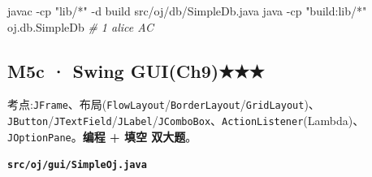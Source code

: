\documentclass[
  11pt,
]{ctexart}
\newenvironment{Shaded}{\begin{snugshade}}{\end{snugshade}}
\newcommand{\AttributeTok}[1]{\textcolor[rgb]{0.13,0.29,0.53}{#1}}
\newcommand{\CommentTok}[1]{\textcolor[rgb]{0.56,0.35,0.01}{\textit{#1}}}
\newcommand{\ExtensionTok}[1]{#1}
\newcommand{\NormalTok}[1]{#1}
\newcommand{\StringTok}[1]{\textcolor[rgb]{0.31,0.60,0.02}{#1}}
\begin{document}
\begin{Shaded}
\begin{Highlighting}[]
\ExtensionTok{javac} \AttributeTok{{-}cp} \StringTok{"lib/*"} \AttributeTok{{-}d}\NormalTok{ build src/oj/db/SimpleDb.java}
\ExtensionTok{java} \AttributeTok{{-}cp} \StringTok{"build:lib/*"}\NormalTok{ oj.db.SimpleDb            }\CommentTok{\# 1 alice AC}
\end{Highlighting}
\end{Shaded}

\hypertarget{m5c-swing-guich9}{%
\subsection{M5c · Swing GUI(Ch9)★★★}\label{m5c-swing-guich9}}

考点:\texttt{JFrame}、布局(\texttt{FlowLayout}/\texttt{BorderLayout}/\texttt{GridLayout})、\texttt{JButton}/\texttt{JTextField}/\texttt{JLabel}/\texttt{JComboBox}、\texttt{ActionListener}(Lambda)、\texttt{JOptionPane}。\textbf{编程
+ 填空 双大题}。

\textbf{\texttt{src/oj/gui/SimpleOj.java}}
\end{document}
